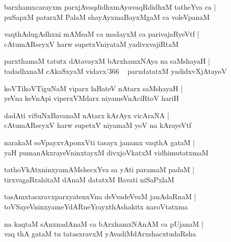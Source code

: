 \documentclass[twoside,12pt,openright]{book}
\newcounter{shloka}[chapter]
\begin{document}
\begin{shloka}%
barxhamxcarayxm parxjAvaqdidhxmAyuvaqRdidhxM tatheYva ca |\\
puSapxM patarxM PalaM shayAyxmaBayxMgaM ca voleVpanaM 
\end{shloka}

\begin{shloka}%
vaqthAdugAdhxni mAMsaM ca madayxM ca parivajaRyeVtf |\\
cAtumARseyxV harw supetxVniyataM yadivxvajiRtaM
\end{shloka}

\begin{shloka}%
parxthamaM tatutx dAtavayxM bArxhamxNAya na saMshayaH |\\
tadadhxnaM cAkaSxyaM vidavx\char'366 ~ parxdatatxM yadidxvXjAtayoV 
\end{shloka}

\begin{shloka}%
koVTikoVTiguNaM viparx laBateV nAtarx saMshayaH |\\
yeVna keVnApi viperxVMdarx niyameVnAciRtoV hariH 
\end{shloka}

\begin{shloka}%
dadAti viSuNxBavanaM nAtarx kArAyx vicAraNA |\\
cAtumARseyxV harw supetxV niyamaM yoV na kArayeVtf
\end{shloka}

\begin{shloka}%
narakaM soVpayxvAponxVti tasayx janamx vaqthA gataM |\\
yaH pumanAkxrayeVninxtayxM divxjoVkatxM vidhimutatxmaM
\end{shloka}

\begin{shloka}%
tathoVkAtxninxyamAMshecxYva sa yAti paramaM padaM |\\
tirxvagaRrahitaM dAnaM datatxM Bavati niSaPxlaM
\end{shloka}

\begin{shloka}%
tasAmxtasxravxparxyatenxVna deVvadeVvaM janAdaRnaM |\\
toVSayeVninxyameYdARneYrayxthAshakitx naroVtatxma
\end{shloka}

\begin{shloka}%
na kaqtaM sAnxnadAnaM ca bArxhamxNAnAM ca pUjanaM |\\
vaq thA gataM tu tatasxravxM yAvadiMdArxshacxtudaRsha
\end{shloka}
\end{document}
